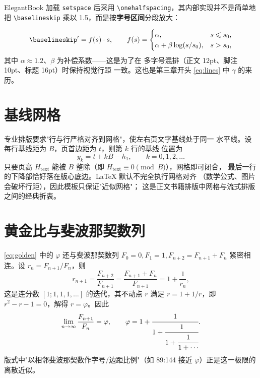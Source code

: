 ElegantBook 加载 \texttt{setspace} 后采用
\verb|\onehalfspacing|，其内部实现并不是简单地把
\verb|\baselineskip| 乘以 1.5，而是按\textbf{字号区间}分段放大：

\begin{equation}
  \verb|\baselineskip|' = f(s) \cdot s,
  \qquad
  f(s) = \begin{cases}
    \alpha, & s \leqslant s_0,\\
    \alpha + \beta \log(s/s_0), & s > s_0,
  \end{cases}
  \label{eq:setspace}
\end{equation}
其中 $\alpha\approx1.2$、$\beta$ 为补偿系数——这是为了在
多字号混排（正文 12pt、脚注 10pt、标题 16pt）时保持视觉行距
一致。这也是第三章开头 \eqref{eq:lines} 中 $\gamma$ 的来历。

\section{基线网格}

专业排版要求"行与行严格对齐到网格"，使左右页文字基线处于同一
水平线。设每行基线距为 $B$，页首边距为 $t$，则第 $k$ 行的基线
位置为
\begin{equation}
  y_k = t + k B - h_1, \qquad k=0,1,2,\dots
  \label{eq:grid}
\end{equation}
只要页高 $H_{\mathrm{text}}$ 能被 $B$ 整除（即
$H_{\mathrm{text}} \equiv 0 \pmod{B}$），网格即可闭合，
最后一行的下降部恰好落在版心底边。LaTeX 默认不完全执行网格对齐
（数学公式、图片会破坏行距），因此模板只保证"近似网格"；
这是正文书籍排版中网格与流式排版之间的经典折衷。

\section{黄金比与斐波那契数列}

\eqref{eq:golden} 中的 $\varphi$ 还与斐波那契数列
$F_0=0,F_1=1,F_{n+2}=F_{n+1}+F_n$ 紧密相连。设 $r_n =
F_{n+1}/F_n$，则
\begin{equation}
  r_{n+1} = \frac{F_{n+2}}{F_{n+1}}
  = \frac{F_{n+1}+F_n}{F_{n+1}}
  = 1 + \frac{1}{r_n},
\end{equation}
这是连分数 $[1;1,1,1,\dots]$ 的迭代，其不动点 $r$ 满足
$r=1+1/r$，即 $r^2-r-1=0$，解得 $r=\varphi$。因此
\begin{equation}
  \lim_{n\to\infty}\frac{F_{n+1}}{F_n} = \varphi,
  \qquad
  \varphi = 1 + \cfrac{1}{1+\cfrac{1}{1+\cfrac{1}{1+\cdots}}}.
  \label{eq:continued}
\end{equation}
版式中"以相邻斐波那契数作字号/边距比例"（如 89:144 接近
$\varphi$）正是这一极限的离散近似。

